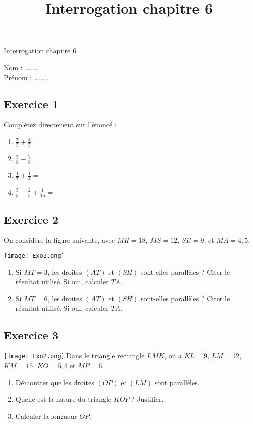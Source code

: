 \documentclass[14 pt]{extarticle}
\title{Interrogation chapitre 6}
\date{}
\theoremstyle{plain}
\begin{document}
\begin{center}{\Large Interrogation chapitre 6}\\ 
 \end{center}
 Nom : \ldots\ldots\ldots\\
 Prénom : \ldots\ldots\ldots
 
 \subsection*{Exercice 1}
 Complétez directement sur l'énoncé : 
 
 \begin{enumerate}
 \item $\frac75 + \frac45 =  $ 
 \item $\frac58 - \frac78=  $ 
 \item $\frac17 + \frac14 =  $
 \item $\frac53 - \frac25 +  \frac1{15} =  $
 \end{enumerate}
 
\subsection*{Exercice 2} 
 
On considère la figure suivante, avec $MH = 18$, $MS= 12$, $SH = 9$, et $MA = 4,5$. 

 \texttt{[image: Exo3.png]}\newline
\begin{enumerate}
\item Si $MT= 3$, les droites $(AT)$ et $(SH)$ sont-elles parallèles ?
Citer le résultat utilisé. Si oui, calculer $TA$. 
\item Si $MT= 6$, les droites $(AT)$ et $(SH)$ sont-elles parallèles ?
Citer le résultat utilisé. Si oui, calculer $TA$.  
\end{enumerate}
 
 \subsection*{Exercice 3}
 
 \texttt{[image: Exo2.png]}\newline
Dans le triangle rectangle $LMK$, on a $KL = 9$, $LM= 12$, $KM=15$, $KO= 5,4$ et $MP= 6$. \begin{enumerate}
\item 
 Démontrer que les droites $(OP)$ et $(LM)$ sont parallèles.
 \item Quelle est la nature du triangle $KOP$ ? Justifier.
 \item 
 Calculer la longueur $OP$. 
\end{enumerate}
\end{document}
